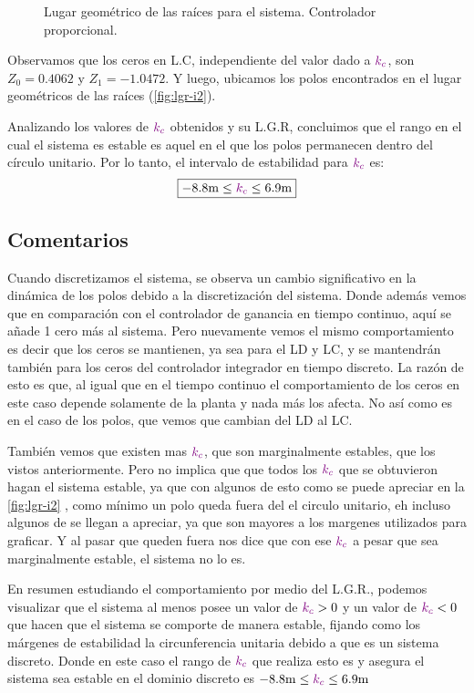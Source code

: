 \begin{figure}[ht]
    \centering
    
    \caption{Lugar geométrico de las raíces para el sistema. Controlador proporcional.}
    \label{fig:lgr-i2}
\end{figure}

Observamos que los ceros en L.C, independiente del valor dado a \(\mathbin{\color{violet}k_c}\),
son $Z_{0} = 0.4062 $ y $Z_{1} = -1.0472$. Y luego, ubicamos los polos encontrados
en el lugar geométricos de las raíces (\autoref{fig:lgr-i2}).

Analizando los valores de \(\mathbin{\color{violet}k_c}\) obtenidos y su L.G.R, concluimos que el
rango en el cual el sistema es estable es aquel en el que los polos permanecen
dentro del círculo unitario. Por lo tanto, el intervalo de estabilidad para \(\mathbin{\color{violet}k_c}\) es:
\begin{equation}
  \boxed{ -8.8\unit{m} \leq \mora{k_{c}} \leq 6.9\unit{m} }
\end{equation}

\FloatBarrier
\subsection{Comentarios}



Cuando discretizamos el sistema, se observa un cambio significativo en la dinámica de los polos debido a la discretización del sistema. Donde además vemos que en comparación con el controlador de ganancia en tiempo continuo, aquí se añade 1 cero más al sistema. Pero nuevamente vemos el mismo comportamiento es decir que los ceros se mantienen, ya sea para el LD y LC, y se mantendrán también para los ceros del controlador integrador en tiempo discreto. La razón de esto es que, al igual que en el tiempo continuo el comportamiento de los ceros en este caso depende solamente de la planta y nada más los afecta. No así como es en el caso de los polos, que vemos que cambian del LD al LC.

También vemos que existen mas \( \mathbin{\color{violet}k_c}\), que son marginalmente estables, que los vistos anteriormente. Pero no implica que  que todos los \( \mathbin{\color{violet}k_c}\) que se obtuvieron hagan el sistema estable, ya que con algunos de esto como se puede apreciar en la \autoref{fig:lgr-i2} , como mínimo un polo queda fuera del el circulo unitario, eh incluso algunos de se llegan a apreciar, ya que son mayores a los margenes utilizados para graficar. Y al pasar que queden fuera nos dice que con ese \( \mathbin{\color{violet}k_c}\) a pesar que sea marginalmente estable, el sistema no lo es. 

En resumen estudiando el comportamiento por medio del L.G.R., podemos visualizar que el sistema al menos posee un valor de \( \mathbin{\color{violet}k_c} > 0 \) y un valor de \( \mathbin{\color{violet}k_c} < 0 \) que hacen que el sistema se comporte de manera estable, fijando como los márgenes de estabilidad la circunferencia unitaria debido a que es un sistema discreto. Donde en este caso el rango de \( \mathbin{\color{violet}k_c}\) que realiza esto es y asegura el sistema sea estable en el dominio discreto es \(-8.8\unit{m} \leq \mora{k_{c}} \leq 6.9\unit{m} \)  